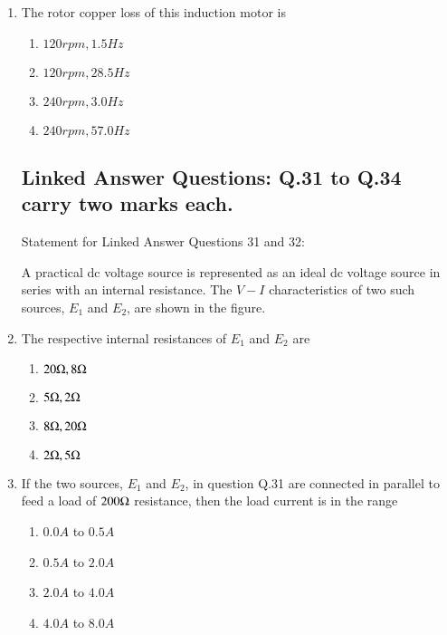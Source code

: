 \documentclass[journal]{IEEEtran}
\begin{document}
\begin{enumerate}
    \item The rotor copper loss of this induction motor is
        \begin{enumerate}
            \item $120rpm, 1.5Hz$
            \item $120rpm, 28.5Hz$
            \item $240rpm, 3.0Hz$
            \item $240rpm, 57.0Hz$
        \end{enumerate}

\subsection*{Linked Answer Questions: Q.31 to Q.34 carry two marks each.}

Statement for Linked Answer Questions 31 and 32:

A practical dc voltage source is represented as an ideal dc voltage source in series with an internal resistance. The $V-I$ characteristics of two such sources, $E_1$ and $E_2$, are shown in the figure.
        \begin{figure}[!ht]
            \centering
            
        \end{figure}

    \item The respective internal resistances of $E_1$ and $E_2$ are
        \begin{enumerate}
            \item $20\ohm,8\ohm$
            \item $5\ohm,2\ohm$
            \item $8\ohm,20\ohm$
            \item $2\ohm,5\ohm$
        \end{enumerate}

    \item If the two sources, $E_1$ and $E_2$, in question Q.31 are connected in parallel to feed a load of $200\ohm$ resistance, then the load current is in the range 
        \begin{enumerate}
            \item $0.0A$ to $0.5A$
            \item $0.5A$ to $2.0A$
            \item $2.0A$ to $4.0A$
            \item $4.0A$ to $8.0A$
        \end{enumerate}


\end{enumerate}
\end{document}
